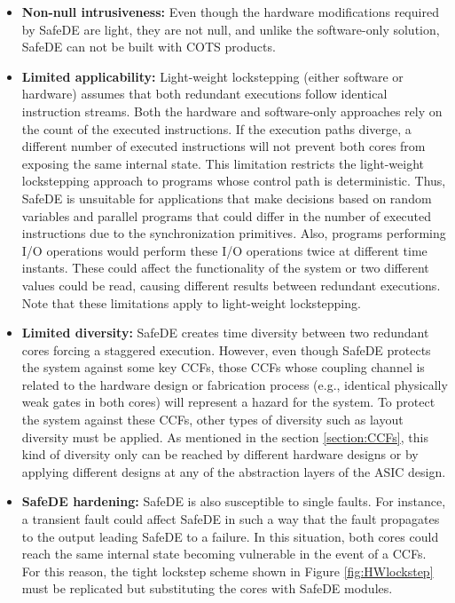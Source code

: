 \begin{itemize}
    \item \textbf{Non-null intrusiveness:} Even though the hardware modifications required by SafeDE are light, they are not null, and unlike the software-only solution, SafeDE can not be built with COTS products.

    \item \textbf{Limited applicability:} Light-weight lockstepping (either software or hardware)  assumes that both redundant executions follow identical instruction streams. Both the hardware and software-only approaches rely on the count of the executed instructions. If the execution paths diverge, a different number of executed instructions will not prevent both cores from exposing the same internal state. This limitation restricts the light-weight lockstepping approach to programs whose control path is deterministic. Thus, SafeDE is unsuitable for applications that make decisions based on random variables and parallel programs that could differ in the number of executed instructions due to the synchronization primitives. Also, programs performing I/O operations would perform these I/O operations twice at different time instants. These could affect the functionality of the system or two different values could be read, causing different results between redundant executions. Note that these limitations apply to light-weight lockstepping.

    \item \textbf{Limited diversity:} SafeDE creates time diversity between two redundant cores forcing a staggered execution. However, even though SafeDE protects the system against some key CCFs, those CCFs whose coupling channel is related to the hardware design or fabrication process (e.g., identical physically weak gates in both cores) will represent a hazard for the system. To protect the system against these CCFs, other types of diversity such as layout diversity must be applied. As mentioned in the section \ref{section:CCFs}, this kind of diversity only can be reached by different hardware designs or by applying different designs at any of the abstraction layers of the ASIC design.

    \item \textbf{SafeDE hardening:} SafeDE is also susceptible to single faults. For instance, a transient fault could affect SafeDE in such a way that the fault propagates to the output leading SafeDE to a failure. In this situation, both cores could reach the same internal state becoming vulnerable in the event of a CCFs. For this reason, the tight lockstep scheme shown in Figure \ref{fig:HWlockstep} must be replicated but substituting the cores with SafeDE modules. 
\end{itemize}


